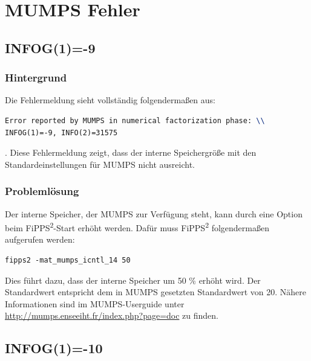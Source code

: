 \documentclass[11pt,titlepage,listof=totoc,bibliography=totoc,twoside]{scrreprt}
\begin{document}
{{\section{MUMPS Fehler}

\subsection{INFOG(1)=-9}

\subsubsection{Hintergrund}

Die Fehlermeldung sieht vollständig folgendermaßen aus: 

\begin{lstlisting}[language=TeX,columns=fullflexible,basicstyle=\ttfamily,caption={Fehlermeldung für INFOG(1)=-9}]
Error reported by MUMPS in numerical factorization phase: \\
INFOG(1)=-9, INFO(2)=31575
\end{lstlisting}

. Diese Fehlermeldung zeigt, dass der interne Speichergröße mit den Standardeinstellungen für MUMPS nicht ausreicht.

\subsubsection{Problemlösung}

Der interne Speicher, der MUMPS zur Verfügung steht, kann durch eine Option beim FiPPS\textsuperscript{2}-Start erhöht werden. Dafür muss FiPPS\textsuperscript{2} folgendermaßen aufgerufen werden:

\begin{lstlisting}[language=TeX,columns=fullflexible,basicstyle=\ttfamily,caption={Aufruf von FiPPS\textsuperscript{2} um INFOG(1)=-9 zu verhindern}]
fipps2 -mat_mumps_icntl_14 50
\end{lstlisting}

Dies führt dazu, dass der interne Speicher um 50 \% erhöht wird. Der Standardwert entspricht dem in MUMPS gesetzten Standardwert von 20. Nähere Informationen sind im MUMPS-Userguide unter \url{http://mumps.enseeiht.fr/index.php?page=doc} zu finden.

\subsection{INFOG(1)=-10}

}}
\end{document}
